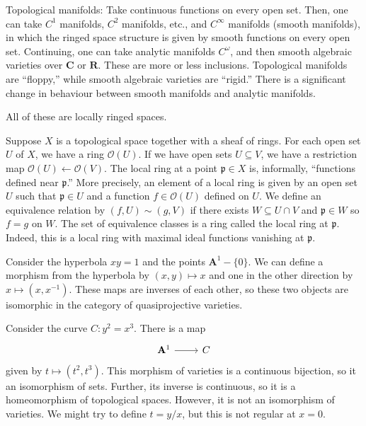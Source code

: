 \documentclass [11 pt, oneside] {article}
\begin{document}
\begin{example}\label{}
	 Topological manifolds: Take continuous functions on every open set. Then, one can take $C^1$ manifolds, $C^2$ manifolds, etc., and $C^\infty$ manifolds (smooth manifolds), in which the ringed space structure is given by smooth functions on every open set. Continuing, one can take analytic manifolds $C^\omega$, and then smooth algebraic varieties over $\mathbf{C}$ or $\mathbf{R}$. These are more or less inclusions. Topological manifolds are ``floppy,'' while smooth algebraic varieties are ``rigid.'' There is a significant change in behaviour between smooth manifolds and analytic manifolds.  

	 All of these are locally ringed spaces.
\end{example}

Suppose $X$ is a topological space together with a sheaf of rings. For each open set $U$ of $X$, we have a ring $\mathscr{O}(U)$. If we have open sets $U\subseteq V$, we have a restriction map $\mathscr{O} (U)  \longleftarrow \mathscr{O}(V)$. The local ring at a point $\mathfrak{p}\in X$ is, informally, ``functions defined near $\mathfrak{p}$.'' More precisely, an element of a local ring is given by an open set $U$ such that $\mathfrak{p}\in U$ and a function $f\in \mathscr{O}(U)$ defined on $U$. We define an equivalence relation by $(f,U)\sim  (g,V)$ if there exists $W\subseteq U\cap V$ and $\mathfrak{p}\in W$  so $f=g$ on $W$. The set of equivalence classes is a ring called the local ring at $\mathfrak{p}$. Indeed, this is a local ring with maximal ideal functions vanishing at $\mathfrak{p}$.

\begin{example}[ ]\label{}
Consider the hyperbola $xy=1$ and the points $\mathbf{A}^1-\{0\}$. We can define a morphism from the hyperbola by $(x,y)\longmapsto x$ and one in the other direction by $x\longmapsto (x,x^{-1})$. These maps are inverses of each other, so these two objects are isomorphic in the category of quasiprojective varieties.
\end{example}

\begin{example}[ ]\label{}
Consider the curve $C: y^2=x^3$. There is a map 
\[
\begin{tikzcd}
\mathbf{A}^1\ar[r]& C
\end{tikzcd}
\] 
given by $t\longmapsto (t^2,t^3)$. This morphism of varieties is a continuous bijection, so it an isomorphism of sets. Further, its inverse is continuous, so it is a homeomorphism of topological spaces. However, it is not an isomorphism of varieties. We might try to define $t = y/x$, but this is not regular at $x=0$.
\end{example}
\end{document}
